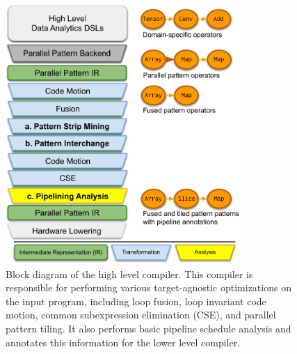 \begin{figure}
\centering
\includegraphics[width=0.8\textwidth]{3-delite/figs/delite-diag}
\caption{\label{fig:delite-diag}Block diagram of the high level compiler.
This compiler is responsible for performing various target-agnostic optimizations
on the input program, including loop fusion, loop invariant code motion, common
subexpression elimination (CSE),
and parallel pattern tiling. It also performs basic pipeline schedule analysis
and annotates this information for the lower level compiler.}
\end{figure}




